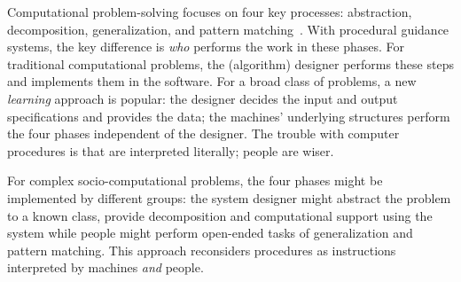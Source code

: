 Computational problem-solving focuses on four key processes: abstraction, decomposition, generalization, and pattern matching~\cite{Wing2006}. With procedural guidance systems, the key difference is \textit{who} performs the work in these phases. For traditional computational problems, the (algorithm) designer performs these steps and implements them in the software. For a broad class of problems, a new \textit{learning} approach is popular: the designer decides the input and output specifications and provides the data; the machines' underlying structures perform the four phases independent of the designer. The trouble with computer procedures is that are interpreted literally; people are wiser. 

For complex socio-computational problems, the four phases might be implemented by different groups: the system designer might abstract the problem to a known class, provide decomposition and computational support using the system while people might perform open-ended tasks of generalization and pattern matching. This approach reconsiders procedures as instructions interpreted by machines \textit{and} people.

